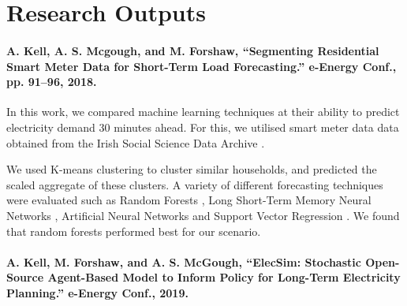 \documentclass[12pt]{article}
\begin{document}
%





\clearpage

\clearpage

\section{Research Outputs}

\paragraph{A. Kell, A. S. Mcgough, and M. Forshaw, ``Segmenting Residential Smart Meter Data for Short-Term Load Forecasting.'' e-Energy Conf., pp. 91--96, 2018. \cite{Kell2018}
}


In this work, we compared machine learning techniques at their ability to predict electricity demand 30 minutes ahead. For this, we utilised smart meter data data obtained from the Irish Social Science Data Archive \cite{cer_2012}.

We used K-means clustering \cite{Forgy65} to cluster similar households, and predicted the scaled aggregate of these clusters. A variety of different forecasting techniques were evaluated such as Random Forests \cite{TinKamHo}, Long Short-Term Memory Neural Networks \cite{lstm}, Artificial Neural Networks \cite{book:984557} and Support Vector Regression \cite{Drucker1997}. We found that random forests performed best for our scenario.


\paragraph{A. Kell, M. Forshaw, and A. S. McGough,  ``ElecSim: Stochastic Open-Source Agent-Based Model to Inform Policy for Long-Term Electricity Planning.''  e-Energy Conf., 2019.
}
\end{document}
